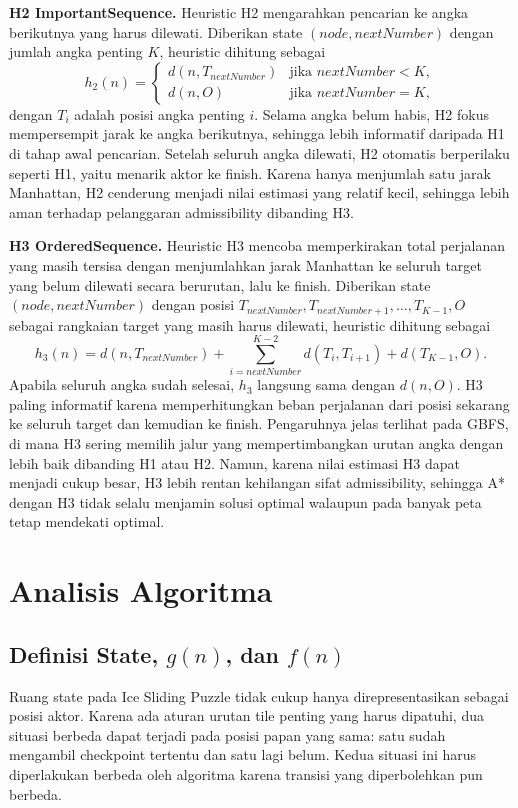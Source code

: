 \documentclass[a4paper,11pt]{article}
\begin{document}
\textbf{H2 ImportantSequence.} Heuristic H2 mengarahkan pencarian ke angka berikutnya yang harus dilewati. Diberikan state $(node, nextNumber)$ dengan jumlah angka penting $K$, heuristic dihitung sebagai
\[
h_2(n) =
\begin{cases}
d(n, T_{nextNumber}) & \text{jika } nextNumber < K, \\
d(n, O) & \text{jika } nextNumber = K,
\end{cases}
\]
dengan $T_i$ adalah posisi angka penting $i$. Selama angka belum habis, H2 fokus mempersempit jarak ke angka berikutnya, sehingga lebih informatif daripada H1 di tahap awal pencarian. Setelah seluruh angka dilewati, H2 otomatis berperilaku seperti H1, yaitu menarik aktor ke finish. Karena hanya menjumlah satu jarak Manhattan, H2 cenderung menjadi nilai estimasi yang relatif kecil, sehingga lebih aman terhadap pelanggaran admissibility dibanding H3.

\textbf{H3 OrderedSequence.} Heuristic H3 mencoba memperkirakan total perjalanan yang masih tersisa dengan menjumlahkan jarak Manhattan ke seluruh target yang belum dilewati secara berurutan, lalu ke finish. Diberikan state $(node, nextNumber)$ dengan posisi $T_{nextNumber}, T_{nextNumber+1}, \dots, T_{K-1}, O$ sebagai rangkaian target yang masih harus dilewati, heuristic dihitung sebagai
\[
h_3(n) = d(n, T_{nextNumber}) + \sum_{i = nextNumber}^{K-2} d(T_i, T_{i+1}) + d(T_{K-1}, O).
\]
Apabila seluruh angka sudah selesai, $h_3$ langsung sama dengan $d(n, O)$. H3 paling informatif karena memperhitungkan beban perjalanan dari posisi sekarang ke seluruh target dan kemudian ke finish. Pengaruhnya jelas terlihat pada GBFS, di mana H3 sering memilih jalur yang mempertimbangkan urutan angka dengan lebih baik dibanding H1 atau H2. Namun, karena nilai estimasi H3 dapat menjadi cukup besar, H3 lebih rentan kehilangan sifat admissibility, sehingga A* dengan H3 tidak selalu menjamin solusi optimal walaupun pada banyak peta tetap mendekati optimal.

\section{Analisis Algoritma}
\subsection{Definisi State, \texorpdfstring{$g(n)$}{g(n)}, dan \texorpdfstring{$f(n)$}{f(n)}}
\label{subsec:state-def}

Ruang state pada Ice Sliding Puzzle tidak cukup hanya direpresentasikan sebagai posisi aktor. Karena ada aturan urutan tile penting yang harus dipatuhi, dua situasi berbeda dapat terjadi pada posisi papan yang sama: satu sudah mengambil checkpoint tertentu dan satu lagi belum. Kedua situasi ini harus diperlakukan berbeda oleh algoritma karena transisi yang diperbolehkan pun berbeda.
\end{document}
